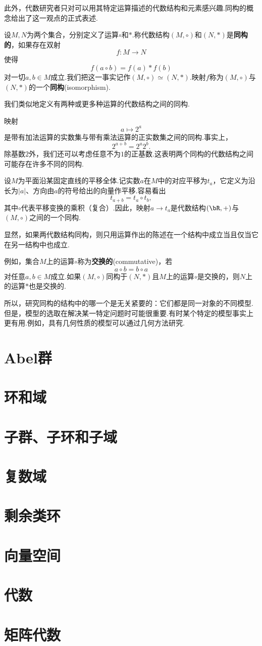 此外，代数研究者只对可以用其特定运算描述的代数结构和元素感兴趣.同构的概念给出了这一观点的正式表述.
\begin{define}
设$M,N$为两个集合，分别定义了运算$\circ$和$\ast$.称代数结构$(M,\circ )$和$(N,\ast )$是\textbf{同构的}，如果存在双射
\[f:M\to N\]
使得
\[f(a\circ b)=f(a)\ast f(b)\]
对一切$a,b\in M$成立.我们把这一事实记作$(M,\circ )\simeq (N,\ast )$.映射$f$称为$(M,\circ )$与$(N,\ast )$的一个\textbf{同构}(isomorphism).
\end{define}
我们类似地定义有两种或更多种运算的代数结构之间的同构.
\begin{example}
映射
\[a\mapsto 2^a\]
是带有加法运算的实数集与带有乘法运算的正实数集之间的同构.事实上，
\[2^{a+b}=2^a2^b.\]
除基数$2$外，我们还可以考虑任意不为$1$的正基数.这表明两个同构的代数结构之间可能存在许多不同的同构.
\end{example}
\begin{example}
设$M$为平面沿某固定直线的平移全体.记实数$a$在$M$中的对应平移为$t_a$，它定义为沿长为$|a|$、方向由$a$的符号给出的向量作平移.容易看出
\[t_{a+b}=t_a\circ t_b,\]
其中$\circ$代表平移变换的乘积（复合）.因此，映射$a\to t_a$是代数结构$(\bR , +)$与$(M, \circ)$之间的一个同构.
\end{example}
显然，如果两代数结构同构，则只用运算作出的陈述在一个结构中成立当且仅当它在另一结构中也成立.

例如，集合$M$上的运算$\circ$称为\textbf{交换的}(commutative)，若
\[a\circ b=b\circ a\]
对任意$a,b\in M$成立.如果$(M,\circ )$同构于$(N,\ast )$且$M$上的运算$\circ$是交换的，则$N$上的运算$\ast$也是交换的.

所以，研究同构的结构中的哪一个是无关紧要的：它们都是同一对象的不同模型.但是，模型的选取在解决某一特定问题时可能很重要.有时某个特定的模型事实上更有用.例如，具有几何性质的模型可以通过几何方法研究.
\section{Abel群}
\section{环和域}
\section{子群、子环和子域}
\section{复数域}
\section{剩余类环}
\section{向量空间}
\section{代数}
\section{矩阵代数}
